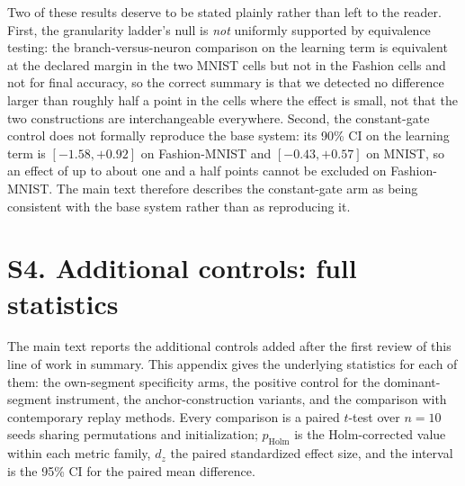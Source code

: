 \documentclass[10pt]{article}
\begin{document}
\noindent Two of these results deserve to be stated plainly rather
than left to the reader. First, the granularity ladder's null is
\emph{not} uniformly supported by equivalence testing: the
branch-versus-neuron comparison on the learning term is equivalent at the
declared margin in the two MNIST cells but not in the Fashion cells and not
for final accuracy, so the correct summary is that we detected no
difference larger than roughly half a point in the cells where the effect
is small, not that the two constructions are interchangeable everywhere.
Second, the constant-gate control does not formally reproduce the base
system: its 90\% CI on the learning term is
$[-1.58,+0.92]$ on Fashion-MNIST and $[-0.43,+0.57]$ on MNIST, so an
effect of up to about one and a half points cannot be excluded on
Fashion-MNIST. The main text therefore describes the constant-gate arm as
being consistent with the base system rather than as reproducing it.
\section{S4. Additional controls: full statistics}
\noindent The main text reports the additional controls added after the
first review of this line of work in summary. This appendix gives the
underlying statistics for each of them: the own-segment specificity arms,
the positive control for the dominant-segment instrument, the
anchor-construction variants, and the comparison with contemporary replay
methods. Every comparison is a paired $t$-test over $n=10$ seeds sharing
permutations and initialization; $p_{\mathrm{Holm}}$ is the
Holm-corrected value within each metric family, $d_z$ the paired
standardized effect size, and the interval is the 95\% CI for the paired
mean difference.
\end{document}
